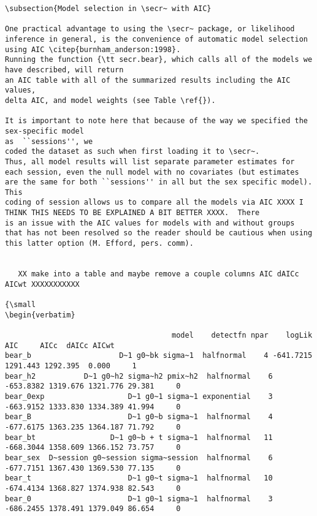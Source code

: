 {\begin{verbatim}
\subsection{Model selection in \secr~ with AIC}

One practical advantage to using the \secr~ package, or likelihood
inference in general, is the convenience of automatic model selection
using AIC \citep{burnham_anderson:1998}.
Running the function {\tt secr.bear}, which calls all of the models we
have described, will return
an AIC table with all of the summarized results including the AIC values,
delta AIC, and model weights (see Table \ref{}). 

It is important to note here that because of the way we specified the sex-specific model
as  ``sessions'', we 
coded the dataset as such when first loading it to \secr~.  
Thus, all model results will list separate parameter estimates for each session, even the null model with no covariates (but estimates are the same for both ``sessions'' in all but the sex specific model). This
coding of session allows us to compare all the models via AIC XXXX I THINK THIS NEEDS TO BE EXPLAINED A BIT BETTER XXXX.  There
is an issue with the AIC values for models with and without groups
that has not been resolved so the reader should be cautious when using
this latter option (M. Efford, pers. comm).


   XX make into a table and maybe remove a couple columns AIC dAICc AICwt XXXXXXXXXXX

{\small
\begin{verbatim}

                                      model    detectfn npar    logLik      AIC     AICc  dAICc AICwt
bear_b                    D~1 g0~bk sigma~1  halfnormal    4 -641.7215 1291.443 1292.395  0.000     1
bear_h2           D~1 g0~h2 sigma~h2 pmix~h2  halfnormal    6 -653.8382 1319.676 1321.776 29.381     0
bear_0exp                   D~1 g0~1 sigma~1 exponential    3 -663.9152 1333.830 1334.389 41.994     0
bear_B                      D~1 g0~b sigma~1  halfnormal    4 -677.6175 1363.235 1364.187 71.792     0
bear_bt                 D~1 g0~b + t sigma~1  halfnormal   11 -668.3044 1358.609 1366.152 73.757     0
bear_sex  D~session g0~session sigma~session  halfnormal    6 -677.7151 1367.430 1369.530 77.135     0
bear_t                      D~1 g0~t sigma~1  halfnormal   10 -674.4134 1368.827 1374.938 82.543     0
bear_0                      D~1 g0~1 sigma~1  halfnormal    3 -686.2455 1378.491 1379.049 86.654     0

\end{verbatim}
}

